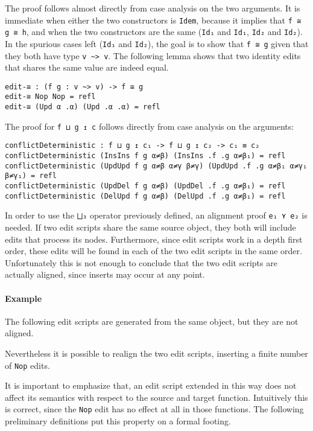 \documentclass[../Thesis.tex]{subfiles}
\begin{document}
	The proof follows almost directly from case analysis on the two arguments.
	It is immediate when either the two constructors is \texttt{Idem}, because
	it implies that \texttt{f ≅ g ≅ h}, and when the two constructors are the 
	same (\texttt{Id₁} and \texttt{Id₁}, \texttt{Id₂} and \texttt{Id₂}).
	In the spurious cases left (\texttt{Id₁} and \texttt{Id₂}), the goal
	is to show that \texttt{f ≅ g} 
	given that they both have type \texttt{v \textasciitilde> v}.
	The following lemma shows that two identity edits that shares the same 
	value are indeed equal.
	
\begin{verbatim}
edit-≅ : (f g : v ~> v) -> f ≅ g
edit-≅ Nop Nop = refl
edit-≅ (Upd α .α) (Upd .α .α) = refl
\end{verbatim}	
	
	The proof for \texttt{f ⊔ g ↥ c} follows directly from case analysis on the 
	arguments:
	
\begin{verbatim}
conflictDeterministic : f ⊔ g ↥ c₁ -> f ⊔ g ↥ c₂ -> c₁ ≡ c₂
conflictDeterministic (InsIns f g α≠β) (InsIns .f .g α≠β₁) = refl
conflictDeterministic (UpdUpd f g α≠β α≠γ β≠γ) (UpdUpd .f .g α≠β₁ α≠γ₁ β≠γ₁) = refl
conflictDeterministic (UpdDel f g α≠β) (UpdDel .f .g α≠β₁) = refl
conflictDeterministic (DelUpd f g α≠β) (DelUpd .f .g α≠β₁) = refl
\end{verbatim}	


	In order to use the \texttt{⨆₃} operator previously defined, an alignment
	proof \texttt{e₁ ⋎ e₂} is needed.
	If two edit scripts share the same source object, they both will include 
	edits that process its nodes. Furthermore, since edit scripts work 
	in a depth first order, these edits will be found in each 
	of the two edit scripts in the same order.
	Unfortunately this is not enough to conclude that the two edit scripts 
	are actually aligned, since inserts may occur at any point.
	
	\paragraph{Example}
	The following edit scripts are generated from the same object,
	but they are not aligned.
	
	Nevertheless it is possible to realign the two edit scripts, inserting
	a finite number of \texttt{Nop} edits.
	
	It is important to emphasize that, an edit script extended in this way
	does not affect its semantics with respect to the source and target function.
	Intuitively this is correct, since the \texttt{Nop} edit has no effect at all
	in those functions.
	The following preliminary definitions put this property on a formal footing.
\end{document}
